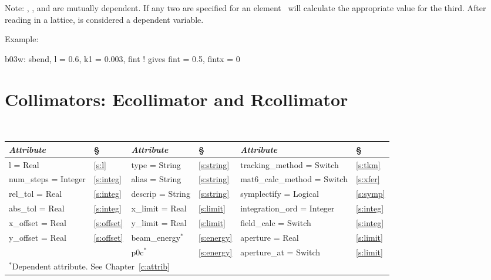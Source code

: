 Note: , , and  are mutually dependent. If any two are
specified for an element \bmad\ will calculate the appropriate value
for the third.  After reading in a lattice,  is considered a
dependent variable.

Example:
\begin{example}
  b03w: sbend, l = 0.6, k1 = 0.003, fint  ! gives fint = 0.5, fintx = 0
\end{example}

\section{Collimators: Ecollimator and Rcollimator}
\label{s:col}

\begin{center}
\tt
\begin{tabular}{|l|l||l|l||l|l|} \hline
  {\sl Attribute} & \S  & {\sl Attribute} & \S & {\sl Attribute} & \S \\ \hline
  l        = Real       & \ref{s:l}      & type = String    & \ref{s:string} & tracking\_method = Switch    & \ref{s:tkm}   \\ \hline
  num\_steps = Integer  & \ref{s:integ}  & alias = String   & \ref{s:string} & mat6\_calc\_method = Switch  & \ref{s:xfer}  \\ \hline
  rel\_tol = Real       & \ref{s:integ}  & descrip = String & \ref{s:string} & symplectify = Logical        & \ref{s:symp}  \\ \hline
  abs\_tol = Real       & \ref{s:integ}  & x\_limit = Real  & \ref{s:limit}  & integration\_ord = Integer   & \ref{s:integ} \\ \hline
  x\_offset  = Real     & \ref{s:offset} & y\_limit = Real  & \ref{s:limit}  & field\_calc = Switch         & \ref{s:integ} \\ \hline
  y\_offset  = Real     & \ref{s:offset} & beam\_energy$^*$ & \ref{s:energy} & aperture = Real              & \ref{s:limit} \\ \hline
                        &                & p0c$^*$          & \ref{s:energy} & aperture\_at = Switch        & \ref{s:limit} \\ \hline
  \multicolumn{6}{l}{\small $^*$Dependent attribute. See Chapter~\ref{c:attrib}} \\
\end{tabular}
\end{center}
\toffset

